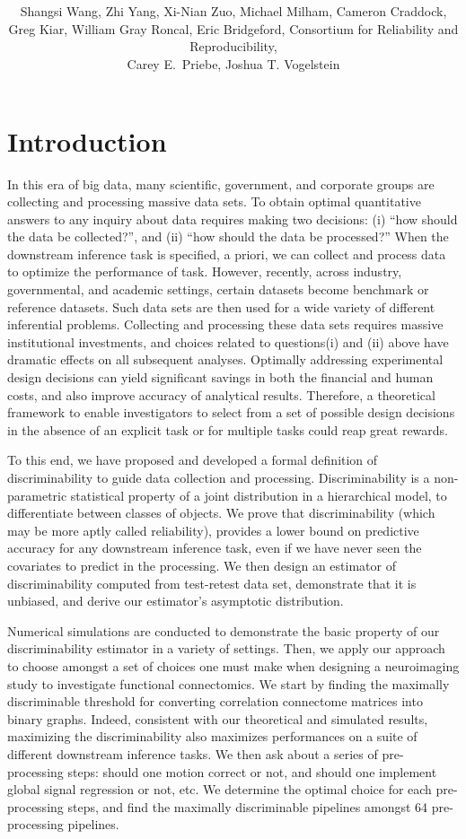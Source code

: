 \documentclass{article}
\title{\vspace{-50pt}
\db{Optimal Design for Discovery Science via Maximizing Discriminability: \\ Applications in Neuroimaging}
}
\author{Shangsi Wang, Zhi Yang, Xi-Nian Zuo, Michael Milham, Cameron Craddock,  \\ 
Greg Kiar, William Gray Roncal, Eric Bridgeford,
Consortium for Reliability and Reproducibility, \\ Carey E.~Priebe, Joshua T. Vogelstein}
\begin{document}
\maketitle
\tableofcontents
\newpage
\linenumbers

\section{Introduction}

In this era of big data, many scientific, government, and corporate groups are collecting and processing massive data sets. To obtain optimal quantitative answers to any inquiry about data requires making two decisions: (i) “how should the data be collected?”, and (ii) “how should the data be processed?”  When the downstream inference task is specified, a priori, we can collect and process data to optimize the performance of task. However, recently, across industry, governmental, and academic settings, certain datasets become benchmark or reference datasets. Such data sets are then used for a wide variety of different inferential problems. Collecting and processing these data sets requires massive institutional investments, and choices related to questions(i) and (ii) above have dramatic effects on all subsequent analyses. Optimally addressing experimental design decisions can yield significant savings in both the financial and human costs, and also improve accuracy of analytical results. Therefore, a theoretical framework to enable investigators to select from a set of possible design decisions in the absence of an explicit task or for multiple tasks could reap great rewards.



 
To this end, we have proposed and developed a formal definition of discriminability to guide data collection and processing. Discriminability is a non-parametric statistical property of a joint distribution in a hierarchical model, to differentiate between classes of objects. We prove that discriminability (which may be more aptly called reliability), provides a lower bound on predictive accuracy for any downstream inference task, even if we have never seen the covariates to predict in the processing. We then design an estimator of discriminability computed from test-retest data set, demonstrate that it is unbiased, and derive our estimator’s asymptotic distribution. 

 Numerical simulations are conducted to demonstrate the basic property of our discriminability estimator in a variety of settings. Then, we apply our approach to choose amongst a set of choices one must make when designing a neuroimaging study to investigate functional connectomics. We start by finding the maximally discriminable threshold for converting correlation connectome matrices into binary graphs. Indeed, consistent with our theoretical and simulated results, maximizing the discriminability also maximizes performances on a suite of different downstream inference tasks. We then ask about a series of pre-processing steps: should one motion correct or not, and should one implement global signal regression or not, etc. We determine the optimal choice for each pre-processing steps, and find the maximally discriminable pipelines amongst 64 pre-processing pipelines.
\end{document}
